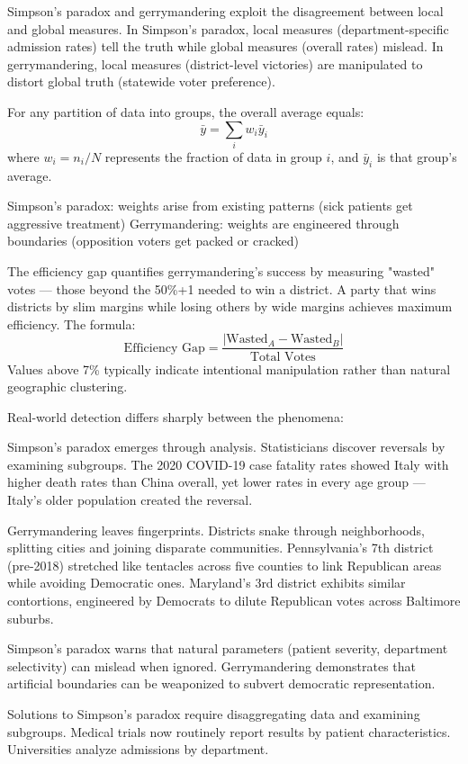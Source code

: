 Simpson’s paradox and gerrymandering exploit the disagreement between local and global measures. In Simpson's paradox, local measures (department-specific admission rates) tell the truth while global measures (overall rates) mislead. In gerrymandering, local measures (district-level victories) are manipulated to distort global truth (statewide voter preference).

For any partition of data into groups, the overall average equals:
\[
\bar{y} = \sum_{i} w_i \bar{y}_i
\]
where $w_i = n_i/N$ represents the fraction of data in group $i$, and $\bar{y}_i$ is that group's average.

Simpson's paradox: weights arise from existing patterns (sick patients get aggressive treatment)
Gerrymandering: weights are engineered through boundaries (opposition voters get packed or cracked)

The efficiency gap quantifies gerrymandering's success by measuring "wasted" votes — those beyond the 50\%+1 needed to win a district. A party that wins districts by slim margins while losing others by wide margins achieves maximum efficiency. The formula:
\[
\text{Efficiency Gap} = \frac{|\text{Wasted}_A - \text{Wasted}_B|}{\text{Total Votes}}
\]
Values above 7\% typically indicate intentional manipulation rather than natural geographic clustering.

Real-world detection differs sharply between the phenomena:

Simpson's paradox emerges through analysis. Statisticians discover reversals by examining subgroups. The 2020 COVID-19 case fatality rates showed Italy with higher death rates than China overall, yet lower rates in every age group — Italy's older population created the reversal.

Gerrymandering leaves fingerprints. Districts snake through neighborhoods, splitting cities and joining disparate communities. Pennsylvania's 7th district (pre-2018) stretched like tentacles across five counties to link Republican areas while avoiding Democratic ones. Maryland's 3rd district exhibits similar contortions, engineered by Democrats to dilute Republican votes across Baltimore suburbs. 

 Simpson's paradox warns that natural parameters (patient severity, department selectivity) can mislead when ignored. Gerrymandering demonstrates that artificial boundaries can be weaponized to subvert democratic representation.

Solutions to Simpson's paradox require disaggregating data and examining subgroups. Medical trials now routinely report results by patient characteristics. Universities analyze admissions by department.

